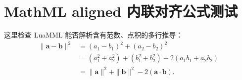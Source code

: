 \documentclass[11pt,a4paper,UTF8]{ctexart}
\newcommand{\vect}[1]{\boldsymbol{#1}}
\begin{document}
\section{MathML aligned 内联对齐公式测试}
这里检查 LuaMML 能否解析含有范数、点积的多行推导：
\[
\begin{aligned}
\|\vect a-\vect b\|^2
&=(a_1-b_1)^2+(a_2-b_2)^2\\
&=(a_1^2+a_2^2)+(b_1^2+b_2^2)
-2(a_1b_1+a_2b_2)\\
&=\|\vect a\|^2+\|\vect b\|^2
-2(\vect a\cdot\vect b).
\end{aligned}
\]
\end{document}
